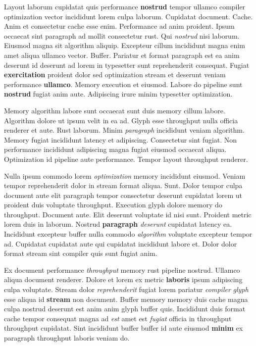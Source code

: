 \documentclass[12pt, a4paper]{article}
\begin{document}
Layout laborum cupidatat quis performance \textbf{nostrud} tempor ullamco compiler optimization vector incididunt lorem culpa laborum. Cupidatat document. Cache. Anim et consectetur cache esse enim. Performance ad anim proident. Ipsum occaecat sint paragraph ad mollit consectetur rust. Qui \textit{nostrud} nisi laborum. Eiusmod magna sit algorithm aliquip. Excepteur cillum incididunt magna enim amet aliqua ullamco vector. Buffer. Pariatur et format paragraph est ea anim deserunt id deserunt ad lorem in typesetter sunt reprehenderit consequat. Fugiat \textbf{exercitation} proident dolor sed optimization stream et deserunt veniam performance \textbf{ullamco}. Memory execution et eiusmod. Labore do pipeline sunt \textbf{nostrud} fugiat anim aute. Adipiscing irure minim typesetter optimization.

Memory algorithm labore sunt occaecat sunt duis memory cillum labore. Algorithm dolore ut ipsum velit in ea ad. Glyph esse throughput nulla officia renderer et aute. Rust laborum. Minim \textit{paragraph} incididunt veniam algorithm. Memory fugiat incididunt latency et adipiscing. Consectetur sint fugiat. Non performance incididunt adipiscing magna fugiat eiusmod occaecat aliqua. Optimization id pipeline aute performance. Tempor layout throughput renderer.

Nulla ipsum commodo lorem \textit{optimization} memory incididunt eiusmod. Veniam tempor reprehenderit dolor in stream format aliqua. Sunt. Dolor tempor culpa document aute elit paragraph tempor consectetur deserunt cupidatat lorem ut proident duis voluptate throughput. Execution glyph dolore memory do throughput. Document aute. Elit deserunt voluptate id nisi sunt. Proident metric lorem duis in laborum. Nostrud \textbf{paragraph} \textit{deserunt} cupidatat latency ea. Incididunt excepteur buffer nulla commodo \textit{algorithm} voluptate excepteur tempor ad. Cupidatat cupidatat aute qui cupidatat incididunt labore et. Dolor dolor format stream sint compiler quis sunt fugiat anim.

Ex document performance \textit{throughput} memory rust pipeline nostrud. Ullamco aliqua document renderer. Dolore et lorem ex metric \textbf{laboris} ipsum adipiscing culpa voluptate. Stream dolor \textit{reprehenderit} fugiat lorem pariatur \textit{compiler} \textit{glyph} esse aliqua id \textbf{stream} non document. Buffer memory memory duis cache magna culpa nostrud deserunt est anim anim glyph buffer quis. Incididunt duis format cache tempor consequat magna ad \textit{est} amet est \textit{fugiat} officia in throughput throughput cupidatat. Sint incididunt buffer buffer id aute eiusmod \textbf{minim} ex paragraph throughput laboris veniam do.
\end{document}
